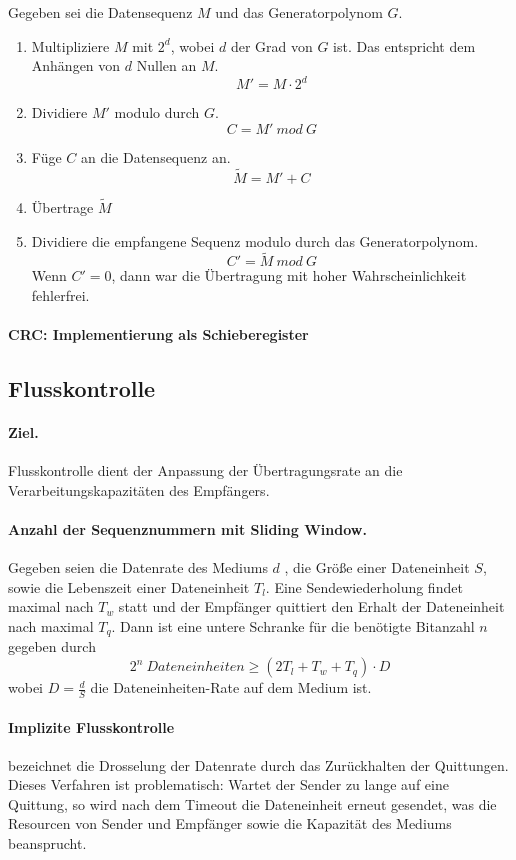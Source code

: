 \documentclass[]{scrartcl}
\begin{document}
Gegeben sei die Datensequenz $M$ und das Generatorpolynom $G$. 
\begin{enumerate}
\item Multipliziere $M$ mit $2^d$, wobei $d$ der Grad von $G$ ist. Das entspricht dem Anh\"angen von $d$ Nullen an $M$.
$$M' = M \cdot 2^d$$
\item Dividiere $M'$ modulo durch $G$. 
$$C = M' \ mod \ G$$
\item F\"uge $C$ an die Datensequenz an.
$$\tilde{M} = M' + C$$
\item \"Ubertrage $\tilde{M}$
\item Dividiere die empfangene Sequenz modulo durch das Generatorpolynom.
$$C' = \tilde{M} \ mod \ G$$
Wenn $C' = 0$, dann war die \"Ubertragung mit hoher Wahrscheinlichkeit fehlerfrei.
\end{enumerate}

\paragraph{CRC: Implementierung als Schieberegister}

\subsection{Flusskontrolle}

\paragraph{Ziel.} Flusskontrolle dient der Anpassung der \"Ubertragungsrate an die Verarbeitungskapazit\"aten des Empf\"angers.

\paragraph{Anzahl der Sequenznummern mit Sliding Window.} Gegeben seien die Datenrate des Mediums $d$ , die Gr\"o{\ss}e einer Dateneinheit $S$, sowie die Lebenszeit einer Dateneinheit $T_{l}$. Eine Sendewiederholung findet maximal nach $T_{w}$ statt und der Empf\"anger quittiert den Erhalt der Dateneinheit nach maximal $T_{q}$. Dann ist eine untere Schranke f\"ur die ben\"otigte Bitanzahl $n$ gegeben durch 
$$2^n \ Dateneinheiten \ge (2 T_{l} + T_{w} + T_{q}) \cdot D $$
wobei $D = \frac{d}{S}$ die Dateneinheiten-Rate auf dem Medium ist.

\paragraph{Implizite Flusskontrolle } bezeichnet die Drosselung der Datenrate durch das Zur\"uckhalten der Quittungen. Dieses Verfahren ist problematisch:
Wartet der Sender zu lange auf eine Quittung, so wird nach dem Timeout die Dateneinheit erneut gesendet, was die Resourcen von Sender und Empf\"anger sowie die Kapazit\"at des Mediums beansprucht.
\end{document}
